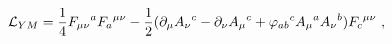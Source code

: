 \begin{equation}
{\cal{L}}_{YM} = \frac{1}{4} {F_{\mu \nu}}^{a} {F_{a}}^{\mu \nu} -
\frac{1}{2} (\partial _{\mu} {A_{\nu}}^{c} -\partial_{\nu}
{A_{\mu}}^{c} + {\varphi_{ab}}^{c} {A_{\mu}}^{a} {A_{\nu}}^{b})
{F_{c}}^{\mu \nu}~, 
\end{equation}

